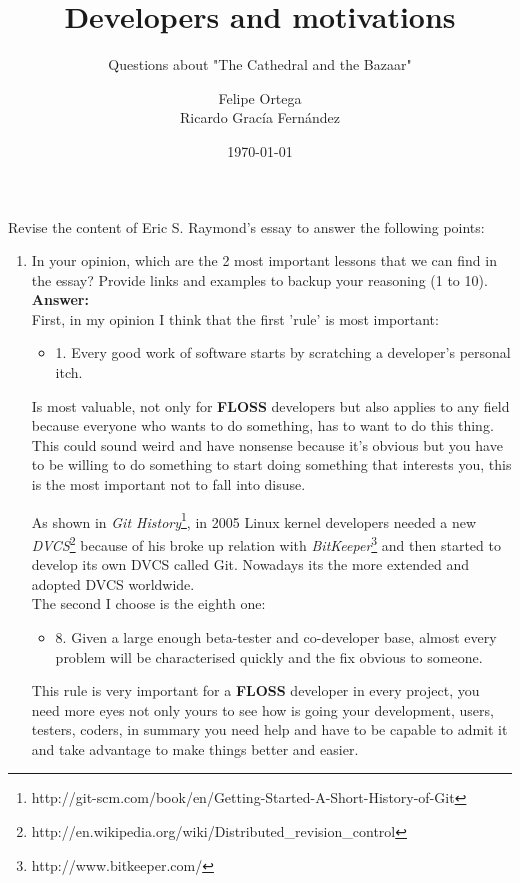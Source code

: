 \documentclass[11pt]{scrartcl}
\title{\textbf{Developers and motivations}}
\subtitle{Questions about "The Cathedral and the Bazaar"}
\author{Felipe Ortega\\
		Ricardo Grac\'ia Fern\'andez}
\date{\today}
\begin{document}
\maketitle

Revise the content of Eric S. Raymond's essay to answer the following points:
	\begin{enumerate}
		\item In your opinion, which are the 2 most important lessons that we can find in the essay? Provide links and examples to backup your reasoning (1 to 10).\\
		
			\textbf{Answer:}\\
			
			First, in my opinion I think that the first 'rule' is most important:
			\begin{itemize}
				\item 1. Every good work of software starts by scratching a developer's personal itch.
			\end{itemize}
			
			\indent Is most valuable, not only for \textbf{FLOSS} developers but also applies to any field because everyone who wants to do something, has to want to do this thing. This could sound weird and have nonsense because it's obvious but you have to be willing to do something to start doing something that interests you, this is the most important not to fall into disuse.
			
			\indent As shown in \emph{Git History}\footnote{http://git-scm.com/book/en/Getting-Started-A-Short-History-of-Git}, in 2005 Linux kernel developers needed a new \emph{DVCS}\footnote{http://en.wikipedia.org/wiki/Distributed\_revision\_control} because of his broke up relation with \emph{BitKeeper}\footnote{http://www.bitkeeper.com/} and then started to develop its own DVCS called Git. Nowadays its the more extended and adopted DVCS worldwide.\\
			
			The second I choose is the eighth one:
			\begin{itemize}
				\item 8. Given a large enough beta-tester and co-developer base, almost every problem will be characterised quickly and the fix obvious to someone.
			\end{itemize}
			
			\indent This rule is very important for a \textbf{FLOSS} developer in every project, you need more eyes not only yours to see how is going your development, users, testers, coders, in summary you need help and have to be capable to admit it and take advantage to make things better and easier.
			

\end{enumerate}
\end{document}
